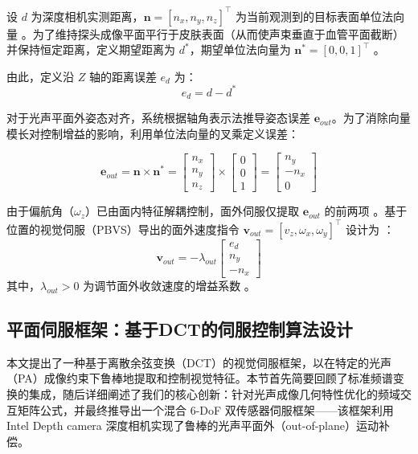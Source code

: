 \documentclass{article}
\begin{document}
设 $d$ 为深度相机实测距离，$\mathbf{n} = [n_x, n_y, n_z]^\top$ 为当前观测到的目标表面单位法向量 。为了维持探头成像平面平行于皮肤表面（从而使声束垂直于血管平面截断）并保持恒定距离，定义期望距离为 $d^*$，期望单位法向量为 $\mathbf{n}^* = [0, 0, 1]^\top$ 。

由此，定义沿 $Z$ 轴的距离误差 $e_d$ 为：
\begin{equation}
e_d = d - d^*
\end{equation}

对于光声平面外姿态对齐，系统根据轴角表示法推导姿态误差 $\mathbf{e}_{out}$。为了消除向量模长对控制增益的影响，利用单位法向量的叉乘定义误差：

\begin{equation}
\mathbf{e}_{out} = \mathbf{n} \times \mathbf{n}^* = \begin{bmatrix} n_x \\ n_y \\ n_z \end{bmatrix} \times \begin{bmatrix} 0 \\ 0 \\ 1 \end{bmatrix} = \begin{bmatrix} n_y \\ -n_x \\ 0 \end{bmatrix}
\end{equation}

由于偏航角（$\omega_z$）已由面内特征解耦控制，面外伺服仅提取 $\mathbf{e}_{out}$ 的前两项 。基于位置的视觉伺服（PBVS）导出的面外速度指令 $\mathbf{v}_{out} = [v_z, \omega_x, \omega_y]^\top$ 设计为 ：
\begin{equation}
\mathbf{v}_{out} = -\lambda_{out} \begin{bmatrix} e_d \\ n_y \\ -n_x \end{bmatrix}
\end{equation}
其中，$\lambda_{out} > 0$ 为调节面外收敛速度的增益系数 。


\subsection{平面伺服框架：基于DCT的伺服控制算法设计}
\label{sec:algorithm}

本文提出了一种基于离散余弦变换（DCT）的视觉伺服框架，以在特定的光声（PA）成像约束下鲁棒地提取和控制视觉特征。本节首先简要回顾了标准频谱变换的集成，随后详细阐述了我们的核心创新：针对光声成像几何特性优化的频域交互矩阵公式，并最终推导出一个混合 6-DoF 双传感器伺服框架——该框架利用 Intel Depth camera 深度相机实现了鲁棒的光声平面外（out-of-plane）运动补偿。
\end{document}
